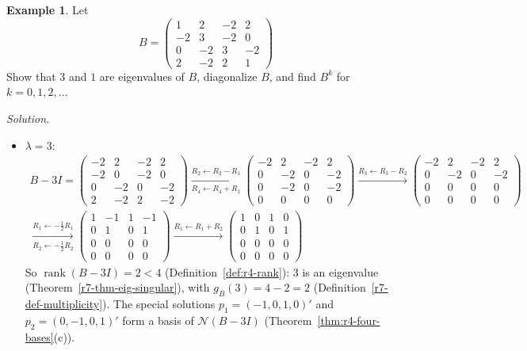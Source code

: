 \documentclass[12pt]{article}
\DeclareMathOperator{\rank}{rank}
\theoremstyle{definition}
\newtheorem{example}[theorem]{Example}
\begin{document}
\begin{example}\label{r7-exm-diag-powers}
Let
\[
B=\begin{pmatrix}1&2&-2&2\\-2&3&-2&0\\0&-2&3&-2\\2&-2&2&1\end{pmatrix}
\]
Show that \(3\) and \(1\) are eigenvalues of \(B\), diagonalize \(B\), and find \(B^k\) for \(k=0,1,2,\dots\)

\textit{Solution.}
\begin{itemize}
\item \(\lambda=3\):
\[
\begin{gathered}
B-3I=\begin{pmatrix}-2&2&-2&2\\-2&0&-2&0\\0&-2&0&-2\\2&-2&2&-2\end{pmatrix}
\xrightarrow[R_4\leftarrow R_4+R_1]{R_2\leftarrow R_2-R_1}
\begin{pmatrix}-2&2&-2&2\\0&-2&0&-2\\0&-2&0&-2\\0&0&0&0\end{pmatrix}
\xrightarrow{R_3\leftarrow R_3-R_2}
\begin{pmatrix}-2&2&-2&2\\0&-2&0&-2\\0&0&0&0\\0&0&0&0\end{pmatrix}
\\
\xrightarrow[R_2\leftarrow-\frac12R_2]{R_1\leftarrow-\frac12R_1}
\begin{pmatrix}1&-1&1&-1\\0&1&0&1\\0&0&0&0\\0&0&0&0\end{pmatrix}
\xrightarrow{R_1\leftarrow R_1+R_2}
\begin{pmatrix}1&0&1&0\\0&1&0&1\\0&0&0&0\\0&0&0&0\end{pmatrix}
\end{gathered}
\]
So \(\rank(B-3I)=2<4\) (Definition~\ref{def:r4-rank}): \(3\) is an eigenvalue (Theorem~\ref{r7-thm-eig-singular}), with
\(g_B(3)=4-2=2\) (Definition~\ref{r7-def-multiplicity}). The special solutions \(p_1=(-1,0,1,0)'\) and
\(p_2=(0,-1,0,1)'\) form a basis of \(\mathcal N(B-3I)\) (Theorem~\ref{thm:r4-four-bases}(c)).

\end{itemize}
\end{example}
\end{document}
